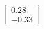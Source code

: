 \documentclass[preview]{standalone}
\begin{document}
\begin{align*}
\begin{bmatrix} 0.28 \\ -0.33 \end{bmatrix}
\end{align*}
\end{document}
